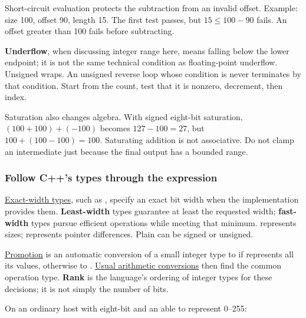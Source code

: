 Short-circuit evaluation protects the subtraction from an invalid offset. Example: size 100, offset 90, length 15. The first test passes, but \(15\le 100-90\) fails. An offset greater than 100 fails before subtracting.

\textbf{Underflow}, when discussing integer range here, means falling below the lower endpoint; it is not the same technical condition as floating-point underflow. Unsigned  wraps. An unsigned reverse loop whose condition is  never terminates by that condition. Start from the count, test that it is nonzero, decrement, then index.

Saturation also changes algebra. With signed eight-bit saturation, \((100+100)+(-100)\) becomes \(127-100=27\), but \(100+(100-100)=100\). Saturating addition is not associative. Do not clamp an intermediate just because the final output has a bounded range.

\subsubsection{Follow C++'s types through the expression}\label{01-foundations-i-ch001-follow-cs-types-through-the-expression}

\hypertarget{01-foundations-i-ch001-follow-cs-types-through-the-expression}{}

\hyperref[appendix-cc04044b5782]{Exact-width types}, such as , specify an exact bit width when the implementation provides them. \textbf{Least-width} types guarantee at least the requested width; \textbf{fast-width} types pursue efficient operations while meeting that minimum.  represents sizes;  represents pointer differences. Plain  can be signed or unsigned.

\hyperref[appendix-45303d03796a]{Promotion} is an automatic conversion of a small integer type to  if  represents all its values, otherwise to . \hyperref[appendix-5e2d663adf7f]{Usual arithmetic conversions} then find the common operation type. \textbf{Rank} is the language's ordering of integer types for these decisions; it is not simply the number of bits.

On an ordinary host with eight-bit  and an  able to represent 0--255:

